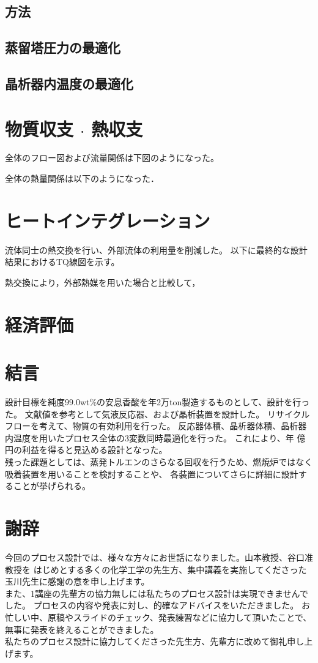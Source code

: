 \documentclass[a4j]{jsreport}
\begin{document}
\section{方法}

\section{蒸留塔圧力の最適化}

\section{晶析器内温度の最適化}

\newpage
\chapter{物質収支 $\cdot$ 熱収支}
全体のフロー図および流量関係は下図のようになった。

全体の熱量関係は以下のようになった．

\newpage
\chapter{ヒートインテグレーション}
流体同士の熱交換を行い、外部流体の利用量を削減した。
以下に最終的な設計結果におけるTQ線図を示す。

熱交換により，外部熱媒を用いた場合と比較して，

\newpage
\chapter{経済評価}

\newpage
\chapter{結言}
設計目標を純度99.0wt\%の安息香酸を年2万ton製造するものとして、設計を行った。
文献値を参考として気液反応器、および晶析装置を設計した。
リサイクルフローを考えて、物質の有効利用を行った。
反応器体積、晶析器体積、晶析器内温度を用いたプロセス全体の3変数同時最適化を行った。
これにより、年 億円の利益を得ると見込める設計となった。\\
残った課題としては、蒸発トルエンのさらなる回収を行うため、燃焼炉ではなく吸着装置を用いることを検討することや、
各装置についてさらに詳細に設計することが挙げられる。

\newpage
\chapter*{謝辞}
今回のプロセス設計では、様々な方々にお世話になりました。山本教授、谷口准教授を
はじめとする多くの化学工学の先生方、集中講義を実施してくださった玉川先生に感謝の意を申し上げます。\\
また、1講座の先輩方の協力無しには私たちのプロセス設計は実現できませんでした。
プロセスの内容や発表に対し、的確なアドバイスをいただきました。
お忙しい中、原稿やスライドのチェック、発表練習などに協力して頂いたことで、無事に発表を終えることができました。\\
私たちのプロセス設計に協力してくださった先生方、先輩方に改めて御礼申し上げます。
\end{document}
